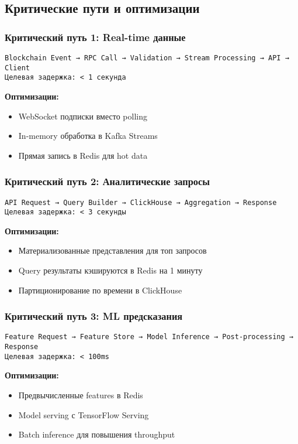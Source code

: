 \documentclass[a4paper,11pt]{article}
\begin{document}
\subsection{Критические пути и оптимизации}

\subsubsection{Критический путь 1: Real-time данные}
\begin{verbatim}
Blockchain Event → RPC Call → Validation → Stream Processing → API → Client
Целевая задержка: < 1 секунда
\end{verbatim}

\textbf{Оптимизации:}
\begin{itemize}
    \item WebSocket подписки вместо polling
    \item In-memory обработка в Kafka Streams
    \item Прямая запись в Redis для hot data
\end{itemize}

\subsubsection{Критический путь 2: Аналитические запросы}
\begin{verbatim}
API Request → Query Builder → ClickHouse → Aggregation → Response
Целевая задержка: < 3 секунды
\end{verbatim}

\textbf{Оптимизации:}
\begin{itemize}
    \item Материализованные представления для топ запросов
    \item Query результаты кэшируются в Redis на 1 минуту
    \item Партиционирование по времени в ClickHouse
\end{itemize}

\subsubsection{Критический путь 3: ML предсказания}
\begin{verbatim}
Feature Request → Feature Store → Model Inference → Post-processing → Response
Целевая задержка: < 100ms
\end{verbatim}

\textbf{Оптимизации:}
\begin{itemize}
    \item Предвычисленные features в Redis
    \item Model serving с TensorFlow Serving
    \item Batch inference для повышения throughput
\end{itemize}
\end{document}

